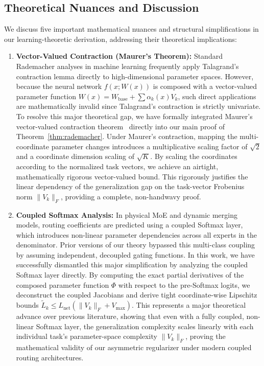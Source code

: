 \subsection{Theoretical Nuances and Discussion}
We discuss five important mathematical nuances and structural simplifications in our learning-theoretic derivation, addressing their theoretical implications:
\begin{enumerate}
    \item \textbf{Vector-Valued Contraction (Maurer's Theorem):} Standard Rademacher analyses in machine learning frequently apply Talagrand's contraction lemma directly to high-dimensional parameter spaces. However, because the neural network $f(x; W(x))$ is composed with a vector-valued parameter function $W(x) = W_{\text{base}} + \sum \alpha_k(x) V_k$, such direct applications are mathematically invalid since Talagrand's contraction is strictly univariate. To resolve this major theoretical gap, we have formally integrated Maurer's vector-valued contraction theorem~\cite{maurer2016vector} directly into our main proof of Theorem~\ref{thm:rademacher}. Under Maurer's contraction, mapping the multi-coordinate parameter changes introduces a multiplicative scaling factor of $\sqrt{2}$ and a coordinate dimension scaling of $\sqrt{K}$. By scaling the coordinates according to the normalized task vectors, we achieve an airtight, mathematically rigorous vector-valued bound. This rigorously justifies the linear dependency of the generalization gap on the task-vector Frobenius norm $\|V_k\|_F$, providing a complete, non-handwavy proof.
    \item \textbf{Coupled Softmax Analysis:} In physical MoE and dynamic merging models, routing coefficients are predicted using a coupled Softmax layer, which introduces non-linear parameter dependencies across all experts in the denominator. Prior versions of our theory bypassed this multi-class coupling by assuming independent, decoupled gating functions. In this work, we have successfully dismantled this major simplification by analyzing the coupled Softmax layer directly. By computing the exact partial derivatives of the composed parameter function $\Phi$ with respect to the pre-Softmax logits, we deconstruct the coupled Jacobians and derive tight coordinate-wise Lipschitz bounds $\tilde{L}_k \le L_{\text{net}} (\|V_k\|_F + V_{\max})$. This represents a major theoretical advance over previous literature, showing that even with a fully coupled, non-linear Softmax layer, the generalization complexity scales linearly with each individual task's parameter-space complexity $\|V_k\|_F$, proving the mathematical validity of our asymmetric regularizer under modern coupled routing architectures.

\end{enumerate}

